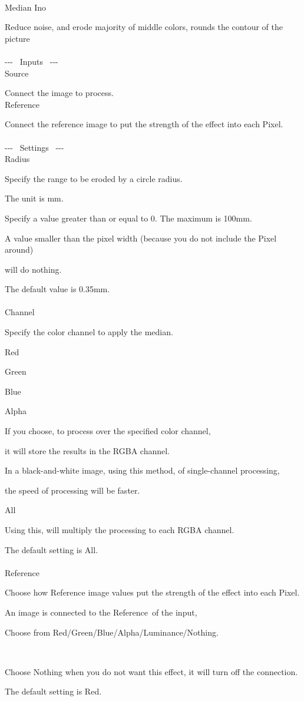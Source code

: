 \documentclass[a4paper,12pt]{article}
\begin{document}
\thispagestyle{empty}

\Large
\noindent \\
Median Ino\medskip
\par
\normalsize
Reduce noise, and erode majority of middle colors, rounds the contour of the picture\\
\\
-{-}- \ Inputs \ -{-}-\\
Source\par
Connect the image to process.\\
Reference\par
Connect the reference image to put the strength of the effect into each Pixel.\\
\\
-{-}- \ Settings \ -{-}-\\
Radius\par
Specify the range to be eroded by a circle radius.\par
The unit is mm.\\
\par
Specify a value greater than or equal to 0. The maximum is 100mm.\par
A value smaller than the pixel width (because you do not include the Pixel around)\par
will do nothing.\\
\par
The default value is 0.35mm.\\
\\
Channel\par
Specify the color channel to apply the median.\\
\par
\textquotedbl Red\textquotedbl\par
\textquotedbl Green\textquotedbl\par
\textquotedbl Blue\textquotedbl\par
\textquotedbl Alpha\textquotedbl\par
If you choose, to process over the specified color channel,\par
it will store the results in the RGBA channel.\par
In a black-and-white image, using this method, of single-channel processing,\par
the speed of processing will be faster.\\
\par
\textquotedbl All\textquotedbl\par
Using this, will multiply the processing to each RGBA channel.\\
\par
The default setting is \textquotedbl All\textquotedbl .\\
\\
Reference\par
Choose how Reference image values put the strength of the effect into each Pixel.\par
An image is connected to the \textquotedbl Reference\textquotedbl \ of the input,\par
Choose from Red/Green/Blue/Alpha/Luminance/Nothing.

\newpage

\thispagestyle{empty}

\ \vspace{-0.2em}
\par
Choose Nothing when you do not want this effect, it will turn off the connection.\par
The default setting is Red.
\end{document}
